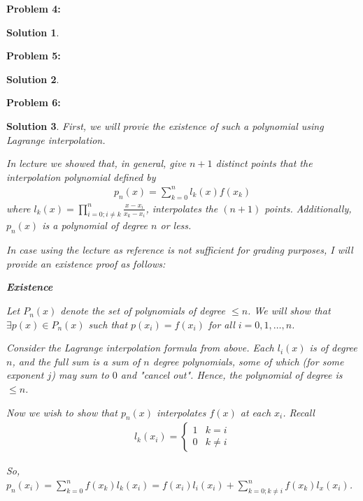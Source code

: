 \documentclass[12pt, letterpaper]{article}
\theoremstyle{nonumberplain}
\newtheorem{sol}{Solution}
\begin{document}
\newpage

\hspace{18pt}\textbf{Problem 4:} \medskip
\begin{sol}

\end{sol}

\newpage

\hspace{18pt}\textbf{Problem 5:} \medskip
\begin{sol}

\end{sol}

\newpage

\hspace{18pt}\textbf{Problem 6:} \medskip
\begin{sol}
	First, we will provie the existence of such a polynomial using Lagrange interpolation.

	In lecture we showed that, in general, give $n+1$ distinct points that the interpolation polynomial defined by
	\begin{gather*}
		p_n(x) = \sum_{k=0}^n l_k(x) f(x_k)
	\end{gather*}
	where $l_k(x) = \prod_{i=0; i\neq k}^n \frac{x - x_i}{x_k - x_i}$, interpolates the $(n+1)$ points. Additionally, $p_n(x)$ is a polynomial of degree $n$ or less.

	In case using the lecture as reference is not sufficient for grading purposes, I will provide an existence proof as follows:

	\textbf{Existence}

	Let $P_n(x)$ denote the set of polynomials of degree $\leq n$. We will show that $\exists p(x) \in P_n(x)$ such that $p(x_i) = f(x_i)$ for all $i = 0, 1, \ldots, n$.

	Consider the Lagrange interpolation formula from above. Each $l_i(x)$ is of degree $n$, and the full sum is a sum of $n$ degree polynomials, some of which (for some exponent $j$) may sum to $0$ and "cancel out". Hence, the polynomial of degree is $\leq n$.

	Now we wish to show that $p_n(x)$ interpolates $f(x)$ at each $x_i$. Recall
	\begin{gather*}
		l_k(x_i) =
		\begin{cases}
			1 & k = i    \\
			0 & k \neq i
		\end{cases}
	\end{gather*}

	So, $p_n(x_i) = \sum_{k=0}^n f(x_k)l_k(x_i) = f(x_i)l_i(x_i) + \sum_{k=0;k\neq i}^n f(x_k)l_x(x_i)$.


\end{sol}
\end{document}

